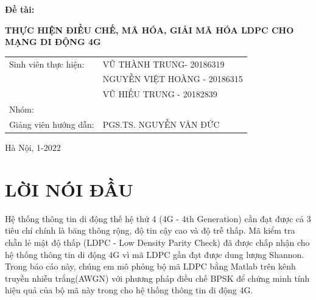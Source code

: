 \documentclass{article}
\begin{document}
\begin{titlepage}
\begin{center}
\end{center}
\hspace{6pt} \textbf{\fontsize{14pt}{0pt}\selectfont Đề tài:}
\begin{center}
    \textbf{\fontsize{20pt}{0pt}\hspace{5pt}\selectfont THỰC HIỆN ĐIỀU CHẾ, MÃ HÓA, GIẢI MÃ HÓA LDPC CHO MẠNG DI ĐỘNG 4G \\}
    \vspace{5pt}
\vspace{2.0cm}
\begin{table}[H]
    \centering
\begin{tabular}{l l}
    \fontsize{14pt}{0pt}\selectfont Sinh viên thực hiện: & \fontsize{14pt}{0pt}\selectfont VŨ THÀNH TRUNG- 20186319 \vspace{6pt} \\
    &  \fontsize{14pt}{0pt}\selectfont NGUYỄN VIỆT HOÀNG - 20186315 \vspace{6pt} \\
    &  \fontsize{14pt}{0pt}\selectfont VŨ HIẾU TRUNG - 20182839 \vspace{6pt} \\
    \fontsize{14pt}{0pt}\selectfont Nhóm: & \fontsize{14pt}{0pt}\selectfont 1 \\
    \fontsize{14pt}{0pt}\selectfont Giảng viên hướng dẫn: &\fontsize{14pt}{0pt}\selectfont PGS.TS. NGUYỄN VĂN ĐỨC \\
\end{tabular}
\end{table}
\vspace{2.5cm}
 \fontsize{14pt}{0pt}\selectfont Hà Nội, 1-2022
\end{center}
\end{titlepage}

\section*{LỜI NÓI ĐẦU}
\thispagestyle{empty}
Hệ thống thông tin di động thế hệ thứ 4 (4G - 4th Generation) cần đạt được cả 3 tiêu chí chính là băng thông rộng, độ tin cậy cao và độ trễ thấp. Mã kiểm tra chẵn lẻ mật độ thấp (LDPC - Low Density Parity Check) đã được chấp nhận cho hệ thống thông tin di động 4G vì mã LDPC gần đạt được dung lượng Shannon. Trong báo cáo này, chúng em mô phỏng bộ mã LDPC bằng Matlab trên kênh truyền nhiễu trắng(AWGN) với phương pháp điều chế BPSK để chứng minh tính hiệu quả của bộ mã này trong cho hệ thống thông tin di động 4G.
\end{document}
